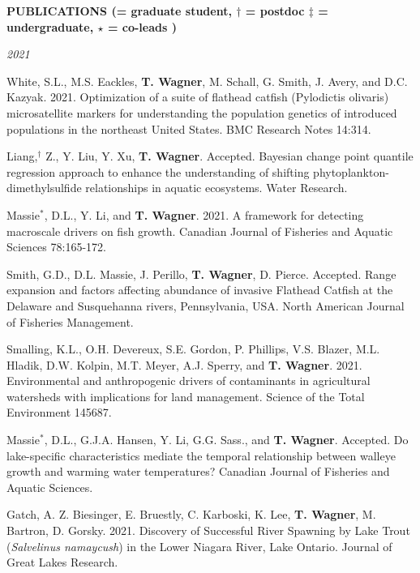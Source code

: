 \documentclass[10pt]{article}
\begin{document}
\begin{flushleft}
\vspace{8pt}
\centerline {\bf{PUBLICATIONS ({\small * = graduate student, $\dagger$ = postdoc $\ddagger$ = undergraduate, $\star$ = co-leads })}}
\vspace{5pt}
\emph{2021}
\begin{etaremune}[start=114]

\item White, S.L., M.S. Eackles, \textbf{T. Wagner}, M. Schall, G. Smith, J. Avery, and D.C. Kazyak. 2021. Optimization of a suite of flathead catfish (Pylodictis olivaris) microsatellite markers for understanding the population genetics of introduced populations in the northeast United States. BMC Research Notes 14:314.

\item Liang,$^\dagger$ Z., Y. Liu, Y. Xu, \textbf{T. Wagner}. Accepted. Bayesian change point quantile regression approach to enhance the understanding of shifting phytoplankton-dimethylsulfide relationships in aquatic ecosystems. Water Research.

\item Massie$^*$, D.L.,  Y. Li, and \textbf{T. Wagner}. 2021. A framework for detecting macroscale drivers on fish growth.  Canadian Journal of Fisheries and Aquatic Sciences 78:165-172.

\item Smith, G.D., D.L. Massie, J. Perillo, \textbf{T. Wagner}, D. Pierce. Accepted. Range expansion and factors affecting abundance of invasive Flathead Catfish at the Delaware and Susquehanna rivers, Pennsylvania, USA. North American Journal of Fisheries Management. 

\item Smalling, K.L., O.H. Devereux, S.E. Gordon, P. Phillips, V.S. Blazer, M.L. Hladik, D.W. Kolpin, M.T. Meyer, A.J. Sperry, and \textbf{T. Wagner}. 2021. Environmental and anthropogenic drivers of contaminants in agricultural watersheds with implications for land management.  Science of the Total Environment 145687.

\item Massie$^*$, D.L., G.J.A. Hansen, Y. Li, G.G. Sass., and \textbf{T. Wagner}. Accepted. Do lake-specific characteristics mediate the temporal relationship between walleye growth and warming water temperatures? Canadian Journal of Fisheries and Aquatic Sciences.

\item Gatch, A. Z. Biesinger, E. Bruestly, C. Karboski, K. Lee, \textbf{T. Wagner}, M. Bartron, D. Gorsky.  2021. Discovery of Successful River Spawning by Lake Trout (\textit{Salvelinus namaycush}) in the Lower Niagara River, Lake Ontario. Journal of Great Lakes Research.


\end{etaremune}
\end{flushleft}
\end{document}
